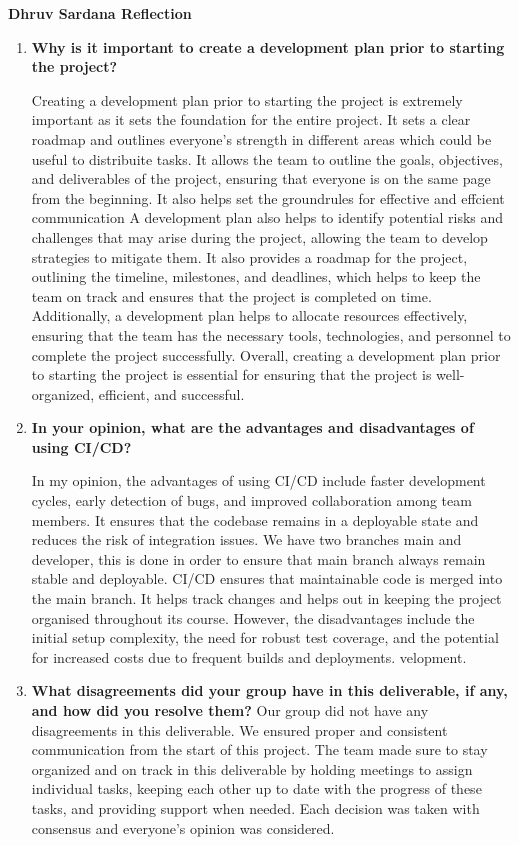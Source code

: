 \documentclass{article}
\begin{document}
\textbf{Dhruv Sardana Reflection}
\begin{enumerate}
    \item  \textbf{Why is it important to create a development plan prior to starting the
    project?} \newline

    Creating a development plan prior to starting the project is extremely important as it sets the foundation for the entire project. It sets a clear roadmap and outlines everyone's strength in different areas which could be useful to distribuite tasks.
    It allows the team to outline the goals, objectives, and deliverables of the project, ensuring that everyone is on the same page from the beginning. It also helps set the groundrules for effective and effcient communication
    A development plan also helps to identify potential risks and challenges that may arise during the project, allowing the team to develop strategies to mitigate them. 
    It also provides a roadmap for the project, outlining the timeline, milestones, and deadlines, which helps to keep the team on track and ensures that the project is completed on time.
    Additionally, a development plan helps to allocate resources effectively, ensuring that the team has the necessary tools, technologies, and personnel to complete the project successfully. 
    Overall, creating a development plan prior to starting the project is essential for ensuring that the project is well-organized, efficient, and successful.

    
    \item \textbf{In your opinion, what are the advantages and disadvantages of using
    CI/CD?} \newline

    In my opinion, the advantages of using CI/CD include faster development cycles, early detection of bugs, and improved collaboration among team members. It ensures that the codebase remains in a deployable state and reduces the risk of integration issues.
    We have two branches main and developer, this is done in order to ensure that main branch always remain stable and deployable. CI/CD ensures that maintainable code is merged into the main branch. It helps track changes and helps out in keeping the project organised throughout its course.
    However, the disadvantages include the initial setup complexity, the need for robust test coverage, and the potential for increased costs due to frequent builds and deployments.
  velopment.

    \item \textbf{What disagreements did your group have in this deliverable, if any,
    and how did you resolve them?}\newline
    Our group did not have any disagreements in this deliverable. We ensured proper and consistent communication from the start of this project. The team made sure to stay organized and on track in this deliverable
    by holding meetings to assign individual tasks, keeping each other up to date with the progress of these tasks, and providing support when needed. Each decision was taken with consensus and everyone's opinion was considered.
\end{enumerate}
\end{document}
